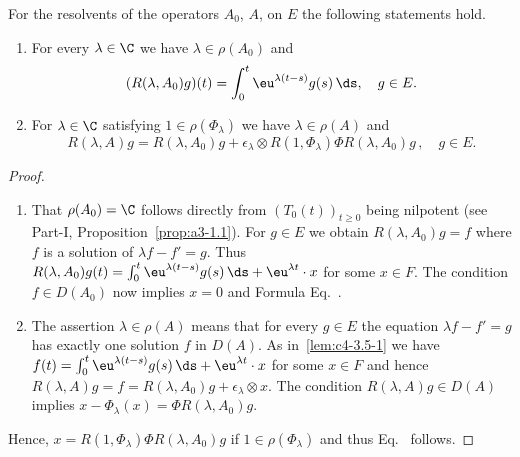 \begin{lemma}\label{lem:c4-3.5}
For the resolvents of the operators $A_{0}$, \resp $A$, on $E$ the following statements hold.
\begin{enumerate}[\upshape (i)]
\item \label{lem:c4-3.5-1}
For every $\lambda \in \C$ we have $\lambda \in \rho(A_{0})$ and
\begin{equation}\label{eq:c4-3.7}
(R(\lambda,A_{0})g)(t) = \int_{0}^{t} \eu^{\lambda(t-s)}g(s)\, \ds, \quad g \in E.
\end{equation}
\item \label{lem:c4-3.5-2}
For $\lambda \in \C$ satisfying $1 \in \rho(\Phi_{\lambda})$ we have $\lambda \in \rho(A)$ and
\begin{equation}\label{eq:c4-3.8}
R(\lambda,A)g = R(\lambda,A_{0})g + \epsilon_{\lambda} \otimes R(1,\Phi_{\lambda})\Phi R(\lambda,A_{0})g\,, \quad g \in E.
\end{equation}
\end{enumerate}
\end{lemma}
\begin{proof}
\begin{enumerate}[\upshape (i), wide, labelindent=.25em] 
    \item 
    That $\rho(A_{0}) = \C$ follows directly from $(T_{0}(t))_{t \geq 0}$ being nilpotent (see Part-I, Proposition~\ref{prop:a3-1.1}). For $g \in E$ we obtain $R(\lambda,A_{0})g = f$ where $f$ is a solution of\/ $\lambda f - f' = g$.
    Thus $R(\lambda,A_{0})g(t) = \int_{0}^{t} \eu^{\lambda(t-s)}g(s)\, \ds + \eu^{\lambda t} \cdot x$ for some $x \in F$. The condition $f \in D(A_{0})$ now implies $x = 0$ and Formula Eq.~.
    
    \item 
    The assertion $\lambda \in \rho(A)$ means that for every $g \in E$ the equation $\lambda f - f' = g$ has exactly one solution $f$ in $D(A)$. As in~\ref{lem:c4-3.5-1} we have 
    $f(t) = \int_{0}^{t} \eu^{\lambda(t-s)}g(s)\, \ds + \eu^{\lambda t} \cdot x$ for some $x \in F$ and hence
    $R(\lambda,A)g = f = R(\lambda,A_{0})g + \epsilon_{\lambda}  \otimes x$. 
    The condition $R(\lambda,A)g \in D(A)$ implies $x - \Phi_{\lambda}(x) = \Phi R(\lambda,A_{0})g$. 
\end{enumerate}    
    Hence, $x = R(1,\Phi_{\lambda})\Phi R(\lambda,A_{0})g$ if\/ $1 \in \rho(\Phi_{\lambda})$ and thus Eq.~ follows.
\end{proof}
